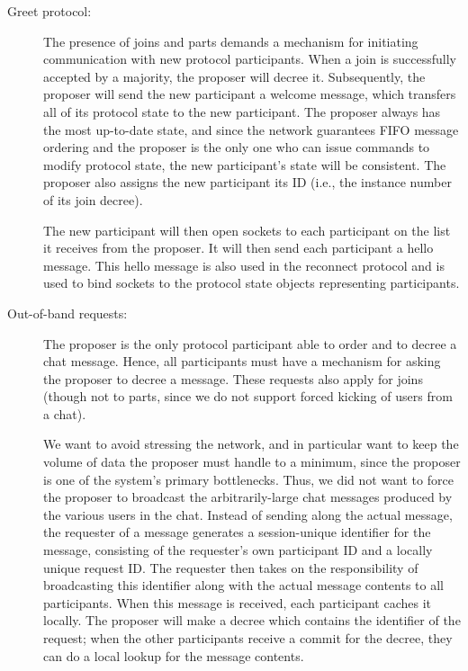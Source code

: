 \documentclass{sig-alternate}
\begin{document}
\begin{description}
  \item[Greet protocol:]
    The presence of joins and parts demands a mechanism for initiating
    communication with new protocol participants.  When a join is successfully
    accepted by a majority, the proposer will decree it.  Subsequently, the
    proposer will send the new participant a welcome message, which transfers
    all of its protocol state to the new participant.  The proposer always has
    the most up-to-date state, and since the network guarantees FIFO message
    ordering and the proposer is the only one who can issue commands to modify
    protocol state, the new participant's state will be consistent.  The
    proposer also assigns the new participant its ID (i.e., the instance
    number of its join decree).

    The new participant will then open sockets to each participant on the
    list it receives from the proposer.  It will then send each participant
    a hello message.  This hello message is also used in the reconnect protocol
    and is used to bind sockets to the protocol state objects representing
    participants.

  \item[Out-of-band requests:]
    The proposer is the only protocol participant able to order and to decree
    a chat message.  Hence, all participants must have a mechanism for asking
    the proposer to decree a message.  These requests also apply for joins
    (though not to parts, since we do not support forced kicking of users from
    a chat).

    We want to avoid stressing the network, and in particular want to keep the
    volume of data the proposer must handle to a minimum, since the proposer is
    one of the system's primary bottlenecks.  Thus, we did not want to force
    the proposer to broadcast the arbitrarily-large chat messages produced by
    the various users in the chat.  Instead of sending along the actual message,
    the requester of a message generates a session-unique identifier for the
    message, consisting of the requester's own participant ID and a locally
    unique request ID.  The requester then takes on the responsibility of
    broadcasting this identifier along with the actual message contents to all
    participants.  When this message is received, each participant caches it
    locally.  The proposer will make a decree which contains the identifier of
    the request; when the other participants receive a commit for the decree,
    they can do a local lookup for the message contents.


\end{description}
\end{document}

